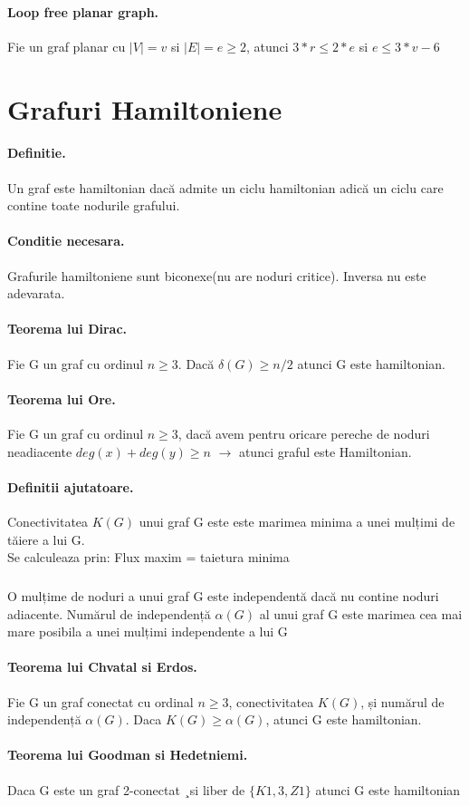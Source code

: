 \documentclass{article}
\begin{document}
\paragraph*{Loop free planar graph.} Fie un graf planar cu $|V|=v$ si $|E|=e \ge 2$, atunci  $3*r \leq 2*e$ si $e \leq 3*v-6$

\section{Grafuri Hamiltoniene}
\paragraph*{Definitie.} Un graf este hamiltonian dacă admite un ciclu hamiltonian adică un ciclu care contine toate nodurile grafului.
\paragraph*{Conditie necesara.} Grafurile hamiltoniene sunt biconexe(nu are noduri critice). Inversa nu este adevarata.
\paragraph*{Teorema lui Dirac.} Fie G un graf cu ordinul $n \geq 3$. Dacă $\delta (G) \geq n/2$ atunci G este hamiltonian.

\paragraph*{Teorema lui Ore.} Fie G un graf cu ordinul $n \geq 3$, dacă avem pentru oricare pereche de noduri neadiacente $deg(x) + deg(y) \geq n$ $\rightarrow$ atunci graful este Hamiltonian.

\paragraph*{Definitii ajutatoare.} Conectivitatea $K(G)$ unui graf G este este marimea minima a unei mulțimi de tăiere a lui G.\\
Se calculeaza prin: Flux maxim = taietura minima
\subparagraph*{} O mulțime de noduri a unui graf G este independentă dacă nu contine
noduri adiacente. Numărul de independență $\alpha (G)$ al unui graf G este marimea cea mai mare posibila a unei mulțimi independente a lui G

\paragraph*{Teorema lui Chvatal si Erdos.} Fie G un graf conectat cu ordinal $n \geq 3$, conectivitatea $K(G)$, și numărul de independență $\alpha(G)$. Daca $K(G) \geq \alpha(G)$, atunci G este hamiltonian.

\paragraph*{Teorema lui Goodman si Hedetniemi.} Daca G este un graf 2-conectat ¸si liber de $\{K1,3, Z1\}$ atunci G este hamiltonian
\end{document}
